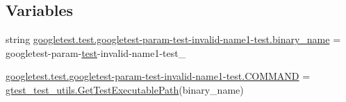 \subsection*{Variables}
\begin{DoxyCompactItemize}
\item 
string \mbox{\hyperlink{namespacegoogletest_1_1test_1_1googletest-param-test-invalid-name1-test_a8d28c943801f6ef770caaca166552b4f}{googletest.\+test.\+googletest-\/param-\/test-\/invalid-\/name1-\/test.\+binary\+\_\+name}} = \textquotesingle{}googletest-\/param-\/\mbox{\hyperlink{_mutual_8h_a707ee03719e99670bf6cfdfd897b8456}{test}}-\/invalid-\/name1-\/test\+\_\+\textquotesingle{}
\item 
\mbox{\hyperlink{namespacegoogletest_1_1test_1_1googletest-param-test-invalid-name1-test_ab8f17c553a432a64a5266b13d71d7da5}{googletest.\+test.\+googletest-\/param-\/test-\/invalid-\/name1-\/test.\+C\+O\+M\+M\+A\+ND}} = \mbox{\hyperlink{namespacegtest__test__utils_a89ed3717984a80ffbb7a9c92f71b86a2}{gtest\+\_\+test\+\_\+utils.\+Get\+Test\+Executable\+Path}}(binary\+\_\+name)
\end{DoxyCompactItemize}

